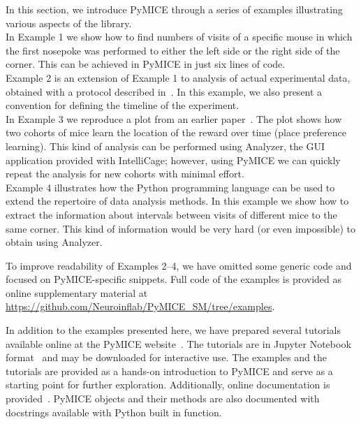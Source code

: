 In this section, we introduce PyMICE through a series of examples illustrating various aspects of the library.\\
In Example 1 we show how to find numbers of visits of a specific mouse in which the first nosepoke was performed to either
the left side or the right side of the corner.
This can be achieved in PyMICE in just six lines of code. \\
Example 2 is an extension of Example 1 to analysis
of actual experimental data, obtained with a protocol described in~\cite{Knapska:2013dj}.
In this example, we also present a convention for
defining the timeline of the experiment.
\\
In Example 3 we reproduce a plot from an earlier paper~\cite{Puscian:2014cu}.
The plot shows how two cohorts of mice learn the location
of the reward over time (place preference learning). This kind of analysis
can be performed using Analyzer, the GUI application provided
with IntelliCage; however, using PyMICE we can quickly repeat the analysis for
new cohorts with minimal effort. \\
Example 4 illustrates how the Python programming language can be used
to extend the repertoire of data analysis methods.
In this example we show how to extract the information about intervals between visits of different mice to the same corner.
This kind of information would be very hard (or even impossible) to obtain using Analyzer.

To improve readability of Examples 2--4, we have omitted some generic code
and focused on PyMICE-specific snippets. Full code of the examples
is provided as online supplementary material at \url{https://github.com/Neuroinflab/PyMICE_SM/tree/examples}.



In addition to the examples presented here, we have prepared several
tutorials available online at the PyMICE website~\cite{pymiceWebsite}.
The tutorials are in Jupyter Notebook format~\cite{jupyterOrg} and may be downloaded
for interactive use.
The examples and the tutorials are provided as a hands-on introduction to
PyMICE and serve as a starting point for further exploration.
Additionally, online documentation is provided~\cite{pymiceDoc}. PyMICE
objects and their methods are also documented with docstrings available with
Python built in  function.

